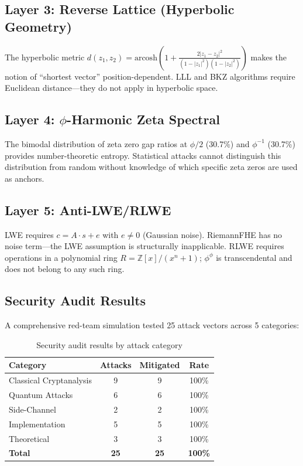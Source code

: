 \documentclass[11pt,a4paper]{article}
\theoremstyle{remark}
\begin{document}
\subsection{Layer 3: Reverse Lattice (Hyperbolic Geometry)}

The hyperbolic metric $d(z_1, z_2) = \text{arcosh}\left(1 + \frac{2|z_1-z_2|^2}{(1-|z_1|^2)(1-|z_2|^2)}\right)$ makes the notion of ``shortest vector'' position-dependent. LLL and BKZ algorithms require Euclidean distance—they do not apply in hyperbolic space.

\subsection{Layer 4: $\phi$-Harmonic Zeta Spectral}

The bimodal distribution of zeta zero gap ratios at $\phi/2$ (30.7\%) and $\phi^{-1}$ (30.7\%) provides number-theoretic entropy. Statistical attacks cannot distinguish this distribution from random without knowledge of which specific zeta zeros are used as anchors.

\subsection{Layer 5: Anti-LWE/RLWE}

LWE requires $c = A \cdot s + e$ with $e \neq 0$ (Gaussian noise). RiemannFHE has no noise term—the LWE assumption is structurally inapplicable. RLWE requires operations in a polynomial ring $R = \mathbb{Z}[x]/(x^n+1)$; $\phi^\phi$ is transcendental and does not belong to any such ring.

\subsection{Security Audit Results}

A comprehensive red-team simulation tested 25 attack vectors across 5 categories:

\begin{table}[H]
\centering
\begin{tabular}{lccc}
\toprule
\textbf{Category} & \textbf{Attacks} & \textbf{Mitigated} & \textbf{Rate} \\
\midrule
Classical Cryptanalysis & 9 & 9 & 100\% \\
Quantum Attacks & 6 & 6 & 100\% \\
Side-Channel & 2 & 2 & 100\% \\
Implementation & 5 & 5 & 100\% \\
Theoretical & 3 & 3 & 100\% \\
\midrule
\textbf{Total} & \textbf{25} & \textbf{25} & \textbf{100\%} \\
\bottomrule
\end{tabular}
\caption{Security audit results by attack category}
\end{table}
\end{document}
